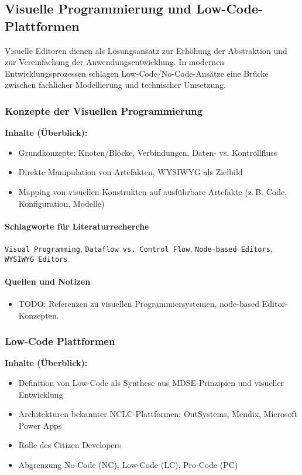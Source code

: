 \subsection{Visuelle Programmierung und Low-Code-Plattformen}\label{subsec:vp-lc}

Visuelle Editoren dienen als Lösungsansatz zur Erhöhung der Abstraktion und zur Vereinfachung der Anwendungsentwicklung. In modernen Entwicklungsprozessen schlagen Low-Code/No-Code-Ansätze eine Brücke zwischen fachlicher Modellierung und technischer Umsetzung.

\subsubsection{Konzepte der Visuellen Programmierung}\label{subsubsec:vp-konzepte}
\textbf{Inhalte (Überblick):}
\begin{itemize}
  \item Grundkonzepte: Knoten/Blöcke, Verbindungen, Daten- vs. Kontrollfluss
  \item Direkte Manipulation von Artefakten, WYSIWYG als Zielbild
  \item Mapping von visuellen Konstrukten auf ausführbare Artefakte (z.\,B. Code, Konfiguration, Modelle)
\end{itemize}

\paragraph{Schlagworte für Literaturrecherche}
\texttt{Visual Programming}, \texttt{Dataflow vs. Control Flow}, \texttt{Node-based Editors}, \texttt{WYSIWYG Editors}

\paragraph{Quellen und Notizen}
\begin{itemize}
  \item TODO: Referenzen zu visuellen Programmiersystemen, node-based Editor-Konzepten.
\end{itemize}

\subsubsection{Low-Code Plattformen}\label{subsubsec:lowcode}
\textbf{Inhalte (Überblick):}
\begin{itemize}
  \item Definition von Low-Code als Synthese aus MDSE-Prinzipien und visueller Entwicklung
  \item Architekturen bekannter NCLC-Plattformen: OutSystems, Mendix, Microsoft Power Apps
  \item Rolle des \glqq Citizen Developers\grqq{}
  \item Abgrenzung No-Code (NC), Low-Code (LC), Pro-Code (PC)
\end{itemize}

